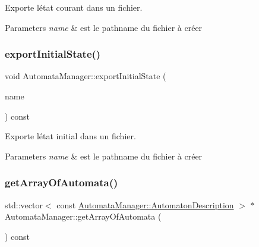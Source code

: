 Exporte l\textquotesingle{}état courant dans un fichier. 


\begin{DoxyParams}{Parameters}
{\em name} & est le pathname du fichier à créer \\
\hline
\end{DoxyParams}
\mbox{\label{class_automata_manager_a85d9f8b8d615af7dfdcef1c951891fb4}} 
\subsubsection{\texorpdfstring{export\+Initial\+State()}{exportInitialState()}}
{\footnotesize\ttfamily void Automata\+Manager\+::export\+Initial\+State (\begin{DoxyParamCaption}\item[{Q\+String const \&}]{name }\end{DoxyParamCaption}) const}



Exporte l\textquotesingle{}état initial dans un fichier. 


\begin{DoxyParams}{Parameters}
{\em name} & est le pathname du fichier à créer \\
\hline
\end{DoxyParams}
\mbox{\label{class_automata_manager_af843cad341a4b2fa4dc932a6e225e3a0}} 
\subsubsection{\texorpdfstring{get\+Array\+Of\+Automata()}{getArrayOfAutomata()}}
{\footnotesize\ttfamily std\+::vector$<$ const \mbox{\hyperlink{class_automata_manager_1_1_automaton_description}{Automata\+Manager\+::\+Automaton\+Description}} $>$ $\ast$ Automata\+Manager\+::get\+Array\+Of\+Automata (\begin{DoxyParamCaption}{ }\end{DoxyParamCaption}) const}



